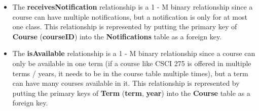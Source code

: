 \documentclass{report}
\begin{document}
\begin{itemize}
\begin{itemize}
        \item The \textbf{receivesNotification} relationship is a 1 - M binary relationship since a course can have multiple notifications, but a notification is only for at most one class. This relationship is represented by putting the primary key of \textbf{Course} (\textbf{courseID}) into the \textbf{Notifications} table as a foreign key.
        \item The \textbf{isAvailable} relationship is a 1 - M binary relationship since a course can only be available in one term (if a course like CSCI 275 is offered in multiple terms / years, it needs to be in the course table multiple times), but a term can have many courses available in it. This relationship is represented by putting the primary keys of \textbf{Term} (\textbf{term}, \textbf{year}) into the \textbf{Course} table as a foreign key.

    \end{itemize}


\end{itemize}
\end{document}
